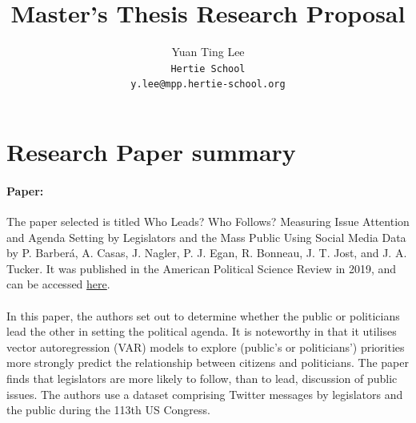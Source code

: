 \documentclass[10pt,twocolumn,letterpaper]{article}
\begin{document}
\title{Master's Thesis Research Proposal}

\author{Yuan Ting Lee 
\\{\tt\small Hertie School}
\\{\tt\small y.lee@mpp.hertie-school.org}
}

\maketitle


\section{Research Paper summary}
\paragraph{Paper:} The paper selected is titled Who Leads? Who Follows? Measuring Issue Attention and Agenda
Setting by Legislators and the Mass Public Using Social Media Data by P. Barberá, A. Casas, J. Nagler, P. J. Egan, R. Bonneau, J. T. Jost, and J. A. Tucker. It was published in the American Political Science Review in 2019, and can be accessed \hyperref[https://doi.org/10.1017/S0003055419000352]{here}. \cite{barberá_2019}

\paragraph{} In this paper, the authors set out to determine whether the public or politicians lead the other in setting the political agenda. It is noteworthy in that it utilises vector autoregression (VAR) models to explore  (public's or politicians') priorities more strongly predict the relationship between citizens and politicians. The paper finds that legislators are more likely to follow, than to lead, discussion of public issues. The authors use a dataset comprising Twitter messages by legislators and the public during the 113th US Congress.

\end{document}
